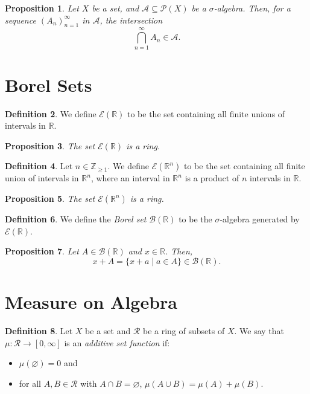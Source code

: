 \documentclass[a4paper, openany]{memoir}
\theoremstyle{definition}
\newtheorem{definition}{Definition}[section]
\theoremstyle{plain}
\newtheorem{proposition}[definition]{Proposition}
\begin{document}
    \begin{proposition}
        Let $X$ be a set, and $\mathcal{A} \subseteq \mathcal{P}(X)$ be a $\sigma$-algebra. Then, for a sequence $(A_n)_{n=1}^\infty$ in $\mathcal{A}$, the intersection
        \[\bigcap_{n=1}^\infty A_n \in \mathcal{A}.\]
    \end{proposition}
    \newpage

    \section{Borel Sets}
    \begin{definition}
        We define $\mathcal{E}(\mathbb{R})$ to be the set containing all finite unions of intervals in $\mathbb{R}$.
    \end{definition}

    \begin{proposition}
        The set $\mathcal{E}(\mathbb{R})$ is a ring.
    \end{proposition}

    \begin{definition}
        Let $n \in \mathbb{Z}_{\geq 1}$. We define $\mathcal{E}(\mathbb{R}^n)$ to be the set containing all finite union of intervals in $\mathbb{R}^n$, where an interval in $\mathbb{R}^n$ is a product of $n$ intervals in $\mathbb{R}$.
    \end{definition}

    \begin{proposition}
        The set $\mathcal{E}(\mathbb{R}^n)$ is a ring.
    \end{proposition}

    \begin{definition}
        We define the \emph{Borel set} $\mathcal{B}(\mathbb{R})$ to be the $\sigma$-algebra generated by $\mathcal{E}(\mathbb{R})$.
    \end{definition}

    \begin{proposition}
        Let $A \in \mathcal{B}(\mathbb{R})$ and $x \in \mathbb{R}$. Then,
        \[x + A = \{x + a \mid a \in A\} \in \mathcal{B}(\mathbb{R}).\]
    \end{proposition}
    \newpage

    \section{Measure on Algebra}
    \begin{definition}
        Let $X$ be a set and $\mathcal{R}$ be a ring of subsets of $X$. We say that $\mu \colon \mathcal{R} \to [0, \infty]$ is an \emph{additive set function} if:
        \begin{itemize}
            \item $\mu(\varnothing) = 0$ and
            \item for all $A, B \in \mathcal{R}$ with $A \cap B = \varnothing$, $\mu(A \cup B) = \mu(A) + \mu(B)$.
        \end{itemize}
    \end{definition}
\end{document}
